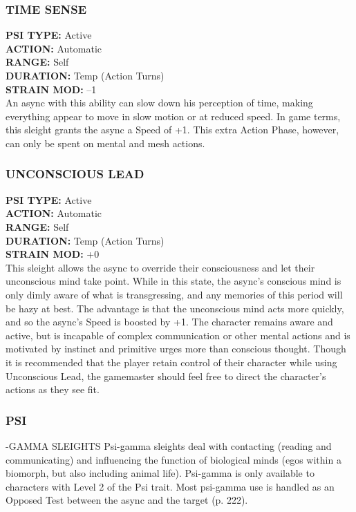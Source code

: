 \subsubsection{TIME SENSE}
\textbf{PSI TYPE:} Active \\ 
\textbf{ACTION:} Automatic \\ 
\textbf{RANGE:} Self \\ 
\textbf{DURATION:} Temp (Action Turns) \\
\textbf{STRAIN MOD:} –1 \\
An async with this ability can slow down his perception
of time, making everything appear to move
in slow motion or at reduced speed. In game terms,
this sleight grants the async a Speed of +1. This extra
Action Phase, however, can only be spent on mental
and mesh actions.

\subsubsection{UNCONSCIOUS LEAD}
\textbf{PSI TYPE:} Active \\ 
\textbf{ACTION:} Automatic \\ 
\textbf{RANGE:} Self \\ 
\textbf{DURATION:} Temp (Action Turns) \\
\textbf{STRAIN MOD:} +0 \\
This sleight allows the async to override their consciousness
and let their unconscious mind take point.
While in this state, the async’s conscious mind is only
dimly aware of what is transgressing, and any memories
of this period will be hazy at best. The advantage
is that the unconscious mind acts more quickly, and
so the async’s Speed is boosted by +1. The character
remains aware and active, but is incapable of complex
communication or other mental actions and is
motivated by instinct and primitive urges more than
conscious thought. Though it is recommended that
the player retain control of their character while using
Unconscious Lead, the gamemaster should feel free to
direct the character’s actions as they see fit.


\subsubsection{PSI}-GAMMA SLEIGHTS
Psi-gamma sleights deal with contacting (reading
and communicating) and influencing the function of
biological minds (egos within a biomorph, but also
including animal life). Psi-gamma is only available to
characters with Level 2 of the Psi trait.
Most psi-gamma use is handled as an Opposed Test
between the async and the target (p. 222).

